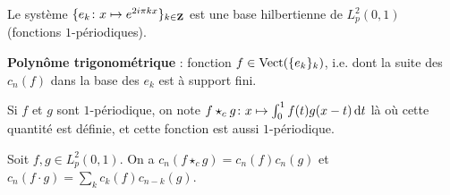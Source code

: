 \begin{thm}
	Le système $\{ e_k \colon x \mapsto e^{2i\pi kx} \}_{k \in \mathbf{Z}}$ est une base hilbertienne de $L_p^2 (0,1)$ (fonctions $1$-périodiques).
\end{thm}

\begin{defn}
	\textbf{Polynôme trigonométrique} : fonction $f \in \operatorname{Vect}(\{ e_k \}_k)$, i.e. dont la suite des $c_n(f)$ dans la base des $e_k$ est à support fini.
\end{defn}

\begin{defn}
	Si $f$ et $g$ sont $1$-périodique, on note $f \star_c g \colon x \mapsto \int_0^1 f(t)g(x - t) \mathop{}\mathopen{}\mathrm{d} t$ là où cette quantité est définie, et cette fonction est aussi $1$-périodique.
\end{defn}

\begin{thm}
	Soit $f,g \in L_p^2 (0,1)$. On a $c_n (f \star_c g) = c_n (f) c_n (g)$ et $c_n (f \cdot g) = \sum_k c_k(f) c_{n - k}(g)$.
\end{thm} 
